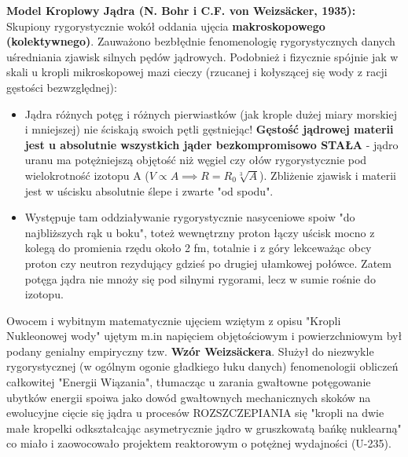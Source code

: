 \documentclass[11pt, a4paper]{article}
\begin{document}
\textbf{Model Kroplowy Jądra (N. Bohr i C.F. von Weizsäcker, 1935):}
Skupiony rygorystycznie wokół oddania ujęcia \textbf{makroskopowego (kolektywnego)}. Zauważono bezbłędnie fenomenologię rygorystycznych danych uśredniania zjawisk silnych pędów jądrowych. Podobnież i fizycznie spójnie jak w skali u kropli mikroskopowej mazi cieczy (rzucanej i kołyszącej się wody z racji gęstości bezwzględnej):
\begin{itemize}
    \item Jądra różnych potęg i różnych pierwiastków (jak krople dużej miary morskiej i mniejszej) nie ściskają swoich pętli gęstniejąc! \textbf{Gęstość jądrowej materii jest u absolutnie wszystkich jąder bezkompromisowo STAŁA} - jądro uranu ma potężniejszą objętość niż węgiel czy ołów rygorystycznie pod wielokrotność izotopu A ($V \propto A \implies R = R_0 \sqrt[3]{A}$). Zbliżenie zjawisk i materii jest w uścisku absolutnie ślepe i zwarte "od spodu".
    \item Występuje tam oddziaływanie rygorystycznie nasyceniowe spoiw "do najbliższych rąk u boku", toteż wewnętrzny proton łączy uścisk mocno z kolegą do promienia rzędu około 2 fm, totalnie i z góry lekceważąc obcy proton czy neutron rezydujący gdzieś po drugiej ułamkowej połówce. Zatem potęga jądra nie mnoży się pod silnymi rygorami, lecz w sumie rośnie do izotopu.
\end{itemize}
Owocem i wybitnym matematycznie ujęciem wziętym z opisu "Kropli Nukleonowej wody" ujętym m.in napięciem objętościowym i powierzchniowym był podany genialny empiryczny tzw. \textbf{Wzór Weizsäckera}. Służył do niezwykle rygorystycznej (w ogólnym ogonie gładkiego łuku danych) fenomenologii obliczeń całkowitej "Energii Wiązania", tłumacząc u zarania gwałtowne potęgowanie ubytków energii spoiwa jako dowód gwałtownych mechanicznych skoków na ewolucyjne cięcie się jądra u procesów ROZSZCZEPIANIA się "kropli na dwie małe kropelki odkształcając asymetrycznie jądro w gruszkowatą bańkę nuklearną" co miało i zaowocowało projektem reaktorowym o potężnej wydajności (U-235).
\end{document}
